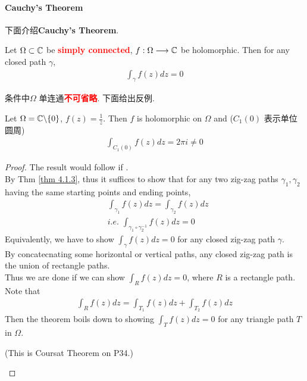 \paragraph{Cauchy's Theorem}
	下面介绍\textbf{Cauchy's Theorem}.
	\begin{thm}\label{thm 4.3.2}
		Let $\Omega \subset \mathbb{C}$ be \textcolor{red}{\textbf{simply connected}}, $f : \Omega \longrightarrow \mathbb{C}$ be holomorphic. Then for any closed path $\gamma$,
		\begin{align}
			\int_{\gamma}{f(z) dz} = 0
		\end{align}
	
		\vspace{1em}
		\begin{rmk}
			条件中$\Omega$ 单连通\textcolor{red}{\textbf{不可省略}}. 下面给出反例.
			\begin{example}\label{ex 4.3.2}
				Let $\Omega = \mathbb{C} \backslash \{ 0 \}$, $f(z) = \frac{1}{z}$. Then $f$ is holomorphic on $\Omega$ and ($C_{1}(0)$ 表示单位圆周)
				\begin{align}
					\int_{C_{1}(0)}{f(z) dz} = 2\pi i \neq 0
				\end{align}
			\end{example}
		\end{rmk}
	
		\vspace{2em}
		\begin{proof}
			The result would follow if . \\
			By Thm \ref{thm 4.1.3}, thus it suffices to show that for any two zig-zag paths $\gamma_1 , \gamma_2$ having the same starting points and ending points,
			\begin{align}
				&\int_{\gamma_1}{f(z) dz} = \int_{\gamma_2}{f(z) dz} \\
				&i.e. \,\, \int_{\gamma_{1} \circ \gamma_{2}^{-1}}{f(z) dz} = 0
			\end{align}
			Equivalently, we have to show $\int_{\gamma}{f(z) dz} = 0$ for any closed zig-zag path $\gamma$.\\
			By concatecnating some horizontal or vertical paths, any closed zig-zag path is the union of rectangle paths.\\
			Thus we are done if we can show $\int_{R}{f(z) dz} = 0$, where $R$ is a rectangle path.\\
			Note that 
			\begin{align}
				\int_{R}{f(z) dz} = \int_{T_1}{f(z) dz} + \int_{T_2}{f(z) dz}
			\end{align}
			Then the theorem boils down to showing $\int_{T}{f(z) dz} = 0$ for any triangle path $T$ in $\Omega$.
			\begin{center}
				(This is Coursat Theorem on P34.)
			\end{center}
		\end{proof}
	\end{thm}
	
